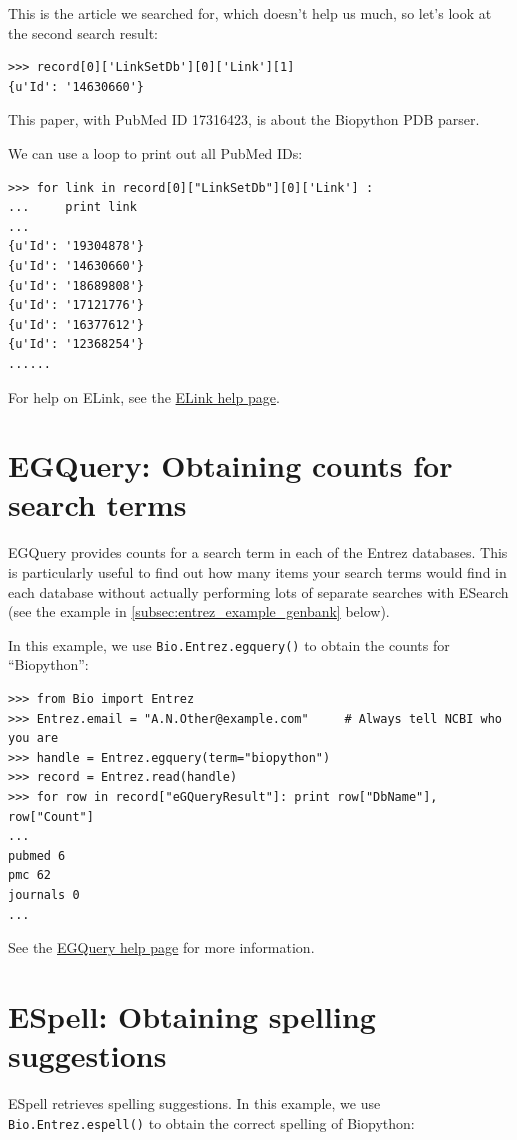 \documentclass{report}
\begin{document}
\noindent This is the article we searched for, which doesn't help us much, so let's look at the second search result:

\begin{verbatim}
>>> record[0]['LinkSetDb'][0]['Link'][1]
{u'Id': '14630660'}
\end{verbatim}

\noindent This paper, with PubMed ID 17316423, is about the Biopython PDB parser.

We can use a loop to print out all PubMed IDs:
\begin{verbatim}
>>> for link in record[0]["LinkSetDb"][0]['Link'] :
...     print link
...
{u'Id': '19304878'}
{u'Id': '14630660'}
{u'Id': '18689808'}
{u'Id': '17121776'}
{u'Id': '16377612'}
{u'Id': '12368254'}
......
\end{verbatim}

For help on ELink, see the \href{http://www.ncbi.nlm.nih.gov/entrez/query/static/elink\_help.html}{ELink help page}.

\section{EGQuery: Obtaining counts for search terms}
EGQuery provides counts for a search term in each of the Entrez databases. This is particularly useful to find out how many items your search terms would find in each database without actually performing lots of separate searches with ESearch (see the example in \ref{subsec:entrez_example_genbank} below).

In this example, we use \verb+Bio.Entrez.egquery()+ to obtain the counts for ``Biopython'':

\begin{verbatim}
>>> from Bio import Entrez
>>> Entrez.email = "A.N.Other@example.com"     # Always tell NCBI who you are
>>> handle = Entrez.egquery(term="biopython")
>>> record = Entrez.read(handle)
>>> for row in record["eGQueryResult"]: print row["DbName"], row["Count"]
...
pubmed 6
pmc 62
journals 0
...
\end{verbatim}
See the \href{http://www.ncbi.nlm.nih.gov/entrez/query/static/egquery\_help.html}{EGQuery help page} for more information.

\section{ESpell: Obtaining spelling suggestions}
ESpell retrieves spelling suggestions. In this example, we use \verb+Bio.Entrez.espell()+ to obtain the correct spelling of Biopython:
\end{document}
